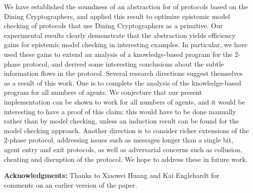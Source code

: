 \documentclass[]{llncs}
\begin{document}
We have established the soundness of an abstraction for 
of protocols based on the Dining Cryptographers, and applied this result to 
optimize epistemic model checking of protocols that use Dining Cryptographers
as a primitive. Our experimental results clearly demonstrate that the abstraction 
yields efficiency gains for epistemic model checking in interesting examples. In particular, 
we have used these gains to extend an analysis of a knowledge-based program for the 
2-phase protocol, and derived some interesting conclusions about the subtle information 
flows in the protocol. Several research directions suggest themselves as a result of this work. 
One is to complete the analysis of the knowledge-based program for all numbers of agents. 
We conjecture that our present implementation can be shown to work for all numbers of agents, 
and it would be interesting to have a proof of this claim: this would have to be done manually 
rather than by model checking, unless an induction result can be found for the model checking 
approach.  Another direction is to consider richer extensions of the 2-phase protocol, 
addressing issues such as messages longer than a single bit, 
agent entry and exit protocols, as well as adversarial concerns such as 
collusion, cheating and disruption of the protocol. We hope to address these in future work.

{\bf Acknowledgments:} Thanks to Xiaowei Huang and Kai Englehardt for comments on an earlier version of the paper. 



\end{document}
